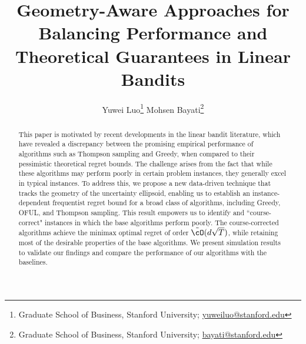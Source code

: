 \documentclass[11pt]{article}
\author{Yuwei Luo\thanks{Graduate School of Business, Stanford University; \href{mailto:yuweiluo@stanford.edu}{yuweiluo@stanford.edu} } \qquad  Mohsen Bayati\thanks{Graduate School of Business, Stanford University; \href{mailto:bayati@stanford.edu}{bayati@stanford.edu}  }}
\date{}
\title{%
Geometry-Aware Approaches for Balancing Performance and Theoretical Guarantees in Linear Bandits
}
\begin{document}
	
\maketitle
\vspace{-0.1 in}



\begin{abstract}
This paper is motivated by recent developments in the linear bandit literature, which have revealed a discrepancy between the promising empirical performance of algorithms such as Thompson sampling and Greedy, when compared to their pessimistic theoretical regret bounds. The challenge arises from the fact that while these algorithms may perform poorly in certain problem instances, they generally excel in typical instances. To address this, we propose a new data-driven technique that tracks the geometry of the uncertainty ellipsoid, enabling us to establish an instance-dependent frequentist regret bound for a broad class of algorithms, including Greedy, OFUL, and Thompson sampling. This result empowers us to identify and ``course-correct" instances in which the base algorithms perform poorly. The course-corrected algorithms achieve the minimax optimal regret of order $\tilde{\cO}(d\sqrt{T})$, while retaining most of the desirable properties of the base algorithms. We present simulation results to validate our findings and compare the performance of our algorithms with the baselines.



\end{abstract}



















\appendix
%

%
\end{document}
